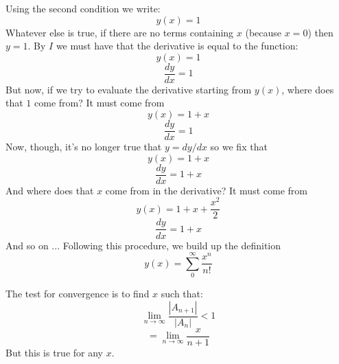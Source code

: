 \documentclass[11pt, oneside]{article}
\begin{document}
Using the second condition we write:
\[ y(x) = 1 \]
Whatever else is true, if there are no terms containing $x$ (because $x=0$) then $y = 1$.  By $I$ we must have that the derivative is equal to the function:
\[ y(x) = 1 \]
\[ \frac{dy}{dx} = 1 \]
But now, if we try to evaluate the derivative starting from $y(x)$, where does that $1$ come from?  It must come from
\[ y(x) = 1 + x \]
\[ \frac{dy}{dx} = 1 \]
Now, though, it's no longer true that $y = dy/dx$ so we fix that
\[ y(x) = 1 + x \]
\[ \frac{dy}{dx} = 1 + x \]
And where does that $x$ come from in the derivative?  It must come from
\[ y(x) = 1 + x + \frac{x^2}{2} \]
\[ \frac{dy}{dx} = 1 + x \]
And so on ...  Following this procedure, we build up the definition
\[ y(x) = \sum_0^{\infty} \frac{x^n}{n!} \]

The test for convergence is to find $x$ such that:
\[ \lim_{n \rightarrow \infty} \frac{|A_{n+1}|}{|A_n|} < 1 \]
\[ = \lim_{n \rightarrow \infty} \frac{x}{n+1} \]
But this is true for any $x$.
\end{document}
